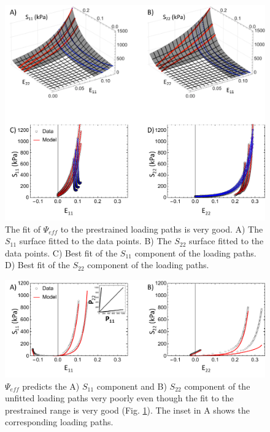 \begin{figure}[hptb]
\centering
\includegraphics[width=\textwidth]{Images/chapter5/effphyfit}
\caption{The fit of $\Psi_{eff}$ to the prestrained loading paths is very good. A) The $S_{11}$ surface fitted to the data points. B) The $S_{22}$ surface fitted to the data points. C) Best fit of the $S_{11}$ component of the loading paths. D) Best fit of the $S_{22}$ component of the loading paths.}
\label{fig:effphyfit}
\end{figure} 

\begin{figure}[hptb]
\centering
\includegraphics[width=\textwidth]{Images/chapter5/effphypred}
\caption{$\Psi_{eff}$ predicts the A) $S_{11}$ component and B) $S_{22}$ component of the unfitted loading paths very poorly even though the fit to the prestrained range is very good (Fig. \ref{fig:effphyfit}). The inset in A shows the corresponding loading paths.}
\label{fig:effphypred}
\end{figure} 


